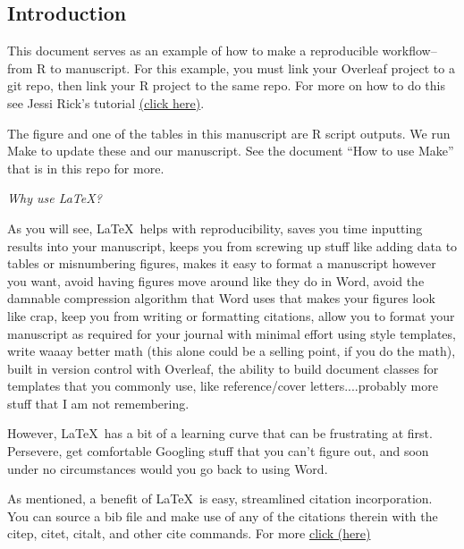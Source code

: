 \documentclass[letterpaper, 12pt]{article}
\begin{document}
\begin{linenumbers} %
\section*{Introduction} %

This document serves as an example of how to make a reproducible workflow--from R to manuscript. 
For this example, you must link your Overleaf project to a git repo, then link your R project to the same repo. For more on how to do this see Jessi Rick's tutorial \href{https://github.com/jessicarick/resources}{(click here)}.

The figure and one of the tables in this manuscript are R script outputs. We run Make to update these and our manuscript. See the document ``How to use Make'' that is in this repo for more. 
\begin{center}
    \emph{Why use \LaTeX?}
\end{center}

As you will see, \LaTeX\ helps with reproducibility, saves you time inputting results into your manuscript, keeps you from screwing up stuff like adding data to tables or misnumbering figures, makes it easy to format a manuscript however you want, avoid having figures move around like they do in Word, avoid the damnable compression algorithm that Word uses that makes your figures look like crap, keep you from writing or formatting citations, allow you to format your manuscript as required for your journal with minimal effort using style templates, write waaay better math (this alone could be a selling point, if you do the math), built in version control with Overleaf, the ability to build document classes for templates that you commonly use, like reference/cover letters....probably more stuff that I am not remembering. 

However, \LaTeX\ has a bit of a learning curve that can be frustrating at first. Persevere, get comfortable Googling stuff that you can't figure out, and soon under no circumstances would you go back to using Word. 

As mentioned, a benefit of \LaTeX\  is easy, streamlined citation incorporation. You can source a bib file and make use of any of the citations therein with the citep, citet, citalt, and other cite commands. For more \href{https://www.imperial.ac.uk/media/imperial-college/administration-and-support-services/library/public/LaTeX-and-BibTeX-branded-jan-2016.pdf}{click (here)}


\end{linenumbers}
\end{document}
